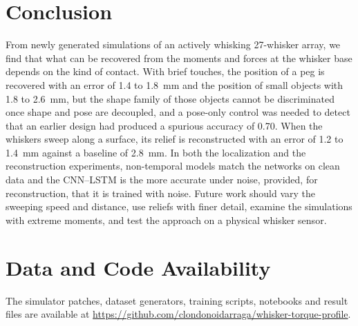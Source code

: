 \documentclass[conference]{IEEEtran}
\begin{document}
\section{Conclusion}
From newly generated simulations of an actively whisking 27-whisker array, we find that what can be recovered from the moments and forces at the whisker base depends on the kind of contact. With brief touches, the position of a peg is recovered with an error of 1.4 to 1.8~mm and the position of small objects with 1.8 to 2.6~mm, but the shape family of those objects cannot be discriminated once shape and pose are decoupled, and a pose-only control was needed to detect that an earlier design had produced a spurious accuracy of 0.70. When the whiskers sweep along a surface, its relief is reconstructed with an error of 1.2 to 1.4~mm against a baseline of 2.8~mm. In both the localization and the reconstruction experiments, non-temporal models match the networks on clean data and the CNN--LSTM is the more accurate under noise, provided, for reconstruction, that it is trained with noise. Future work should vary the sweeping speed and distance, use reliefs with finer detail, examine the simulations with extreme moments, and test the approach on a physical whisker sensor.

\section*{Data and Code Availability}
The simulator patches, dataset generators, training scripts, notebooks and result files are available at \url{https://github.com/clondonoidarraga/whisker-torque-profile}.
\end{document}
